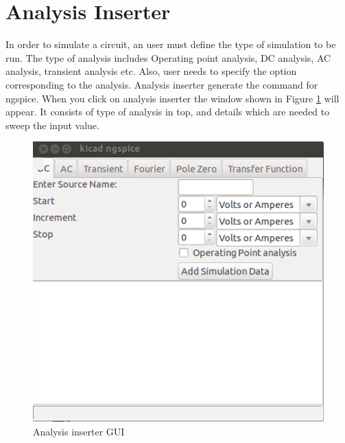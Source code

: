 \section{Analysis Inserter}
\label{ana}
In order to simulate a circuit, an user must define the type of simulation to be run. The type of analysis includes Operating point analysis, DC analysis, AC analysis, transient analysis etc. Also, user needs to specify the option corresponding to the analysis. Analysis inserter generate the command for ngspice. When you click on analysis inserter the window shown in Figure \ref{1} will appear. It consists of type of analysis in top, and details which are needed to sweep the input value. 
\begin{figure}
\centering
\includegraphics[width=\textwidth]{figures/1}
\caption{Analysis inserter GUI}
\label{1}
\end{figure}
